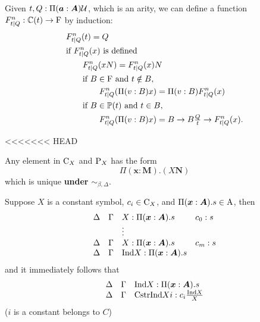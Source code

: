 \begin{definition}
  Given $t, Q : \Pi (\boldsymbol{a} : \boldsymbol{A}) \mathcal{U}$, which is an arity, we can define a function $F^{n}_{t|Q}:\mathbb{C}(t) \to \mathrm{F}$ by induction:
  \begin{align*}
    & F^{n}_{t|Q} (t) = Q \\
    & \text{if } F^{n}_{t|Q} (x) \text{ is defined}\\
    & \qquad F^{n}_{t|Q} ( xN ) = F^{n}_{t|Q} (x) N \\
    & \qquad \text{if } B \in \mathrm{F}\text{ and } t \notin B, \\
    & \qquad \qquad F^{n}_{t|Q} (\Pi(v : B) x) = \Pi(v : B) F^{n}_{t|Q}(x) \\
    & \qquad  \text{if } B \in \mathbb{P}(t) \text{ and } t \in B, \\ 
    & \qquad \qquad F^{n}_{t|Q}(\Pi(v : B) x) = B \rightarrow B\tfrac{Q}{t} \rightarrow F^{n}_{t|Q} (x).
  \end{align*}

\end{definition}




<<<<<<< HEAD
\begin{proposition}
  Any element in $\mathrm{C}_X$ and $\mathrm{P}_X$ has the form 
  \[
    \Pi (\bm x : \bm M) . (X \bm N)
  \]
  which is unique \textbf{under} $\sim_{\beta, \Delta}$.
\end{proposition}








Suppose $X$ is a constant symbol, $c_i \in \mathrm{C}_X$, and $\Pi (\boldsymbol{x}: \boldsymbol{A}).s \in \rm A$, then
\[
  \begin{array}{llll}
    \Delta   &\Gamma   &X: \Pi (\boldsymbol{x}: \boldsymbol{A}).s   &c_0 : s\\
             &         &\vdots                    &       \\
    \Delta   &\Gamma   &X: \Pi (\boldsymbol{x}: \boldsymbol{A}).s   &c_m : s\\
    \Delta   &\Gamma   &\mathrm{Ind} X :  \Pi (\boldsymbol{x}: \boldsymbol{A}).s   &
  \end{array}
\]
and it immediately follows that
\[
  \begin{array}{lll}
    \Delta   &\Gamma   &\mathrm{Ind} X :  \Pi (\boldsymbol{x}: \boldsymbol{A}).s \\
    \Delta   &\Gamma   &\mathrm{Cstr} \mathrm{Ind} X i : c_i \frac{\mathrm{Ind} X}{X}
  \end{array}
\]
($i$ is a constant belongs to $C$)





